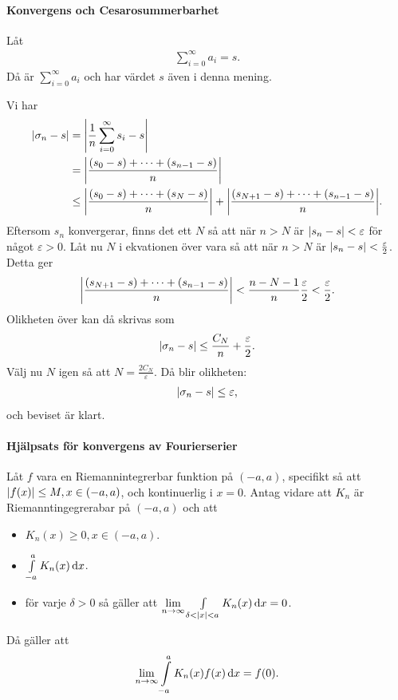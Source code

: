 \paragraph{Konvergens och Cesarosummerbarhet}
Låt
\begin{align*}
	\sum\limits_{i = 0}^{\infty}a_{i} = s.
\end{align*}
Då är $\sum\limits_{i = 0}^{\infty}a_{i}$ och har värdet $s$ även i denna mening.

\proof
Vi har
\begin{align*}
	\abs{\sigma_{n} - s} &= \abs{\frac{1}{n}\sum\limits_{i = 0}^{\infty}s_{i} - s} \\
	                     &= \abs{\frac{(s_{0} - s) + \dots + (s_{n - 1} - s)}{n}} \\
	                     &\leq  \abs{\frac{(s_{0} - s) + \dots + (s_{N} - s)}{n}} + \abs{\frac{(s_{N + 1} - s) + \dots + (s_{n - 1} - s)}{n}}.
\end{align*}
Eftersom $s_{n}$ konvergerar, finns det ett $N$ så att när $n > N$ är $\abs{s_{n} - s} < \varepsilon$ för något $\varepsilon > 0$. Låt nu $N$ i ekvationen över vara så att när $n > N$ är $\abs{s_{n} - s} < \frac{\varepsilon}{2}$. Detta ger
\begin{align*}
	\abs{\frac{(s_{N + 1} - s) + \dots + (s_{n - 1} - s)}{n}} < \frac{n - N - 1}{n}\frac{\varepsilon}{2} < \frac{\varepsilon}{2}.
\end{align*}
Olikheten över kan då skrivas som
\begin{align*}
	\abs{\sigma_{n} - s} \leq \frac{C_{N}}{n} + \frac{\varepsilon}{2}.
\end{align*}
Välj nu $N$ igen så att $N = \frac{2C_{N}}{\varepsilon}$. Då blir olikheten:
\begin{align*}
	\abs{\sigma_{n} - s} \leq \varepsilon,
\end{align*}
och beviset är klart.

\paragraph{Hjälpsats för konvergens av Fourierserier}
Låt $f$ vara en Riemannintegrerbar funktion på $(-a, a)$, specifikt så att $\abs{f(x)}\leq M, x\in (-a, a)$, och kontinuerlig i $x = 0$. Antag vidare att $K_{n}$ är Riemanntingegrerabar på $(-a, a)$ och att
\begin{itemize}
	\item $K_{n}(x)\geq 0, x\in (-a, a)$.
	\item $\int\limits_{-a}^{a}K_{n}(x)\dd{x}$.
	\item för varje $\delta > 0$ så gäller att $\lim\limits_{n\to\infty}\int\limits_{\delta < \abs{x} < a}^{}K_{n}(x)\dd{x} = 0$.
\end{itemize}
Då gäller att
\begin{align*}
	\lim\limits_{n\to\infty}\int\limits_{-a}^{a}K_{n}(x)f(x)\dd{x} = f(0).
\end{align*}

